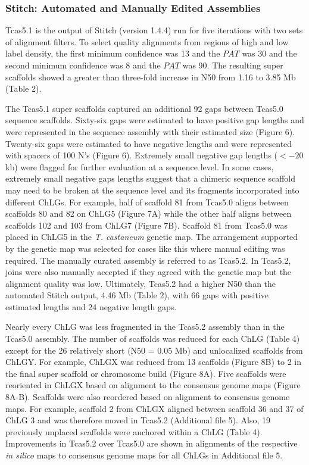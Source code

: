 \documentclass{bmcart}
\begin{document}
\subsubsection*{Stitch: Automated and Manually Edited Assemblies}

Tcas5.1 is the output of Stitch (version 1.4.4) run for five iterations with two sets of alignment filters. To select quality alignments from regions of high and low label density, the first minimum confidence was 13 and the $PAT$ was 30 and the second minimum confidence was 8 and the $PAT$ was 90. The resulting super scaffolds showed a greater than three-fold increase in N50 from 1.16 to 3.85 Mb (Table 2). 

The Tcas5.1 super scaffolds captured an additional 92 gaps between Tcas5.0 sequence scaffolds. Sixty-six gaps were estimated to have positive gap lengths and were represented in the sequence assembly with their estimated size (Figure 6). Twenty-six gaps were estimated to have negative lengths and were represented with spacers of 100 N's (Figure 6). Extremely small negative gap lengths ($< -20$ kb) were flagged for further evaluation at a sequence level. In some cases, extremely small negative gaps lengths suggest that a chimeric sequence scaffold may need to be broken at the sequence level and its fragments incorporated into different ChLGs. For example, half of scaffold 81 from Tcas5.0 aligns between scaffolds 80 and 82 on ChLG5 (Figure 7A) while the other half aligns between scaffolds 102 and 103 from ChLG7 (Figure 7B). Scaffold 81 from Tcas5.0 was placed in ChLG5 in the \textit{T. castaneum} genetic map. The arrangement supported by the genetic map was selected for cases like this where manual editing was required. The manually curated assembly is referred to as Tcas5.2. In Tcas5.2, joins were also manually accepted if they agreed with the genetic map but the alignment quality was low. Ultimately, Tcas5.2 had a higher N50 than the automated Stitch output, 4.46 Mb (Table 2), with 66 gaps with positive estimated lengths and 24 negative length gaps. 

Nearly every ChLG was less fragmented in the Tcas5.2 assembly than in the Tcas5.0 assembly. The number of scaffolds was reduced for each ChLG (Table 4) except for the 26 relatively short (N50 = 0.05 Mb) and unlocalized scaffolds from ChLGY. For example, ChLGX was reduced from 13 scaffolds (Figure 8B) to 2 in the final super scaffold or chromosome build (Figure 8A). Five scaffolds were reoriented in ChLGX based on alignment to the consensus genome maps (Figure 8A-B). Scaffolds were also reordered based on alignment to consensus genome maps. For example, scaffold 2 from ChLGX aligned between scaffold 36 and 37 of ChLG 3 and was therefore moved in Tcas5.2 (Additional file 5). Also, 19 previously unplaced scaffolds were anchored within a ChLG (Table 4). Improvements in Tcas5.2 over Tcas5.0 are shown in alignments of the respective \textit{in silico} maps to consensus genome maps for all ChLGs in Additional file 5.
\end{document}
